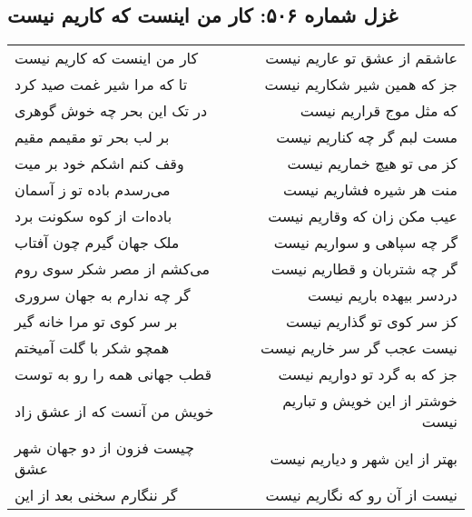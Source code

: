 \begin{center}
\section*{غزل شماره ۵۰۶: کار من اینست که کاریم نیست}
\label{sec:0506}
\begin{longtable}{l p{0.5cm} r}
کار من اینست که کاریم نیست
&&
عاشقم از عشق تو عاریم نیست
\\
تا که مرا شیر غمت صید کرد
&&
جز که همین شیر شکاریم نیست
\\
در تک این بحر چه خوش گوهری
&&
که مثل موج قراریم نیست
\\
بر لب بحر تو مقیمم مقیم
&&
مست لبم گر چه کناریم نیست
\\
وقف کنم اشکم خود بر میت
&&
کز می تو هیچ خماریم نیست
\\
می‌رسدم باده تو ز آسمان
&&
منت هر شیره فشاریم نیست
\\
باده‌ات از کوه سکونت برد
&&
عیب مکن زان که وقاریم نیست
\\
ملک جهان گیرم چون آفتاب
&&
گر چه سپاهی و سواریم نیست
\\
می‌کشم از مصر شکر سوی روم
&&
گر چه شتربان و قطاریم نیست
\\
گر چه ندارم به جهان سروری
&&
دردسر بیهده باریم نیست
\\
بر سر کوی تو مرا خانه گیر
&&
کز سر کوی تو گذاریم نیست
\\
همچو شکر با گلت آمیختم
&&
نیست عجب گر سر خاریم نیست
\\
قطب جهانی همه را رو به توست
&&
جز که به گرد تو دواریم نیست
\\
خویش من آنست که از عشق زاد
&&
خوشتر از این خویش و تباریم نیست
\\
چیست فزون از دو جهان شهر عشق
&&
بهتر از این شهر و دیاریم نیست
\\
گر ننگارم سخنی بعد از این
&&
نیست از آن رو که نگاریم نیست
\\
\end{longtable}
\end{center}
